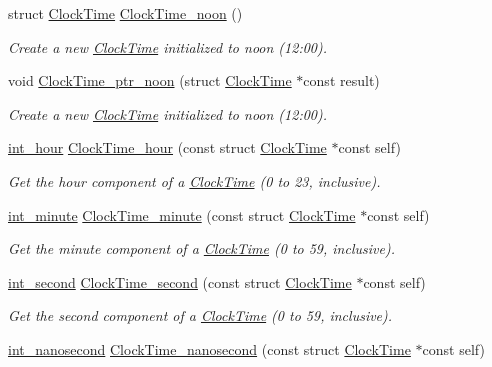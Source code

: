 \begin{DoxyCompactItemize}
struct \hyperlink{structClockTime}{Clock\-Time} \hyperlink{clock-time_8h_a183049a7386a7b7377ba3059d15485c4}{Clock\-Time\-\_\-noon} ()
\begin{DoxyCompactList}\small\item\em Create a new \hyperlink{structClockTime}{Clock\-Time} initialized to noon (12\-:00). \end{DoxyCompactList}\item 
void \hyperlink{clock-time_8h_a0d675e833b96d51d7ba743f09f6a0ee8}{Clock\-Time\-\_\-ptr\-\_\-noon} (struct \hyperlink{structClockTime}{Clock\-Time} $\ast$const result)
\begin{DoxyCompactList}\small\item\em Create a new \hyperlink{structClockTime}{Clock\-Time} initialized to noon (12\-:00). \end{DoxyCompactList}\item 
\hyperlink{types_8h_abc83767329d565949a30f9990b5b2323}{int\-\_\-hour} \hyperlink{clock-time_8h_a197ecd5df7f193d534e51794051ea68c}{Clock\-Time\-\_\-hour} (const struct \hyperlink{structClockTime}{Clock\-Time} $\ast$const self)
\begin{DoxyCompactList}\small\item\em Get the hour component of a \hyperlink{structClockTime}{Clock\-Time} (0 to 23, inclusive). \end{DoxyCompactList}\item 
\hyperlink{types_8h_ac1c9417e7360815b48bbc1efa2b8240c}{int\-\_\-minute} \hyperlink{clock-time_8h_a71ebda6c0d3f39c5ee3287170b081e62}{Clock\-Time\-\_\-minute} (const struct \hyperlink{structClockTime}{Clock\-Time} $\ast$const self)
\begin{DoxyCompactList}\small\item\em Get the minute component of a \hyperlink{structClockTime}{Clock\-Time} (0 to 59, inclusive). \end{DoxyCompactList}\item 
\hyperlink{types_8h_a48e89dcdfecb9766dce0baf6254d089e}{int\-\_\-second} \hyperlink{clock-time_8h_abd89cc75c460c6b9b906c2b433e0f29c}{Clock\-Time\-\_\-second} (const struct \hyperlink{structClockTime}{Clock\-Time} $\ast$const self)
\begin{DoxyCompactList}\small\item\em Get the second component of a \hyperlink{structClockTime}{Clock\-Time} (0 to 59, inclusive). \end{DoxyCompactList}\item 
\hyperlink{types_8h_a6bb2edd220168240795ae6d50d7bf140}{int\-\_\-nanosecond} \hyperlink{clock-time_8h_a68bdc6e05da575968f51c2fcff6bcb8e}{Clock\-Time\-\_\-nanosecond} (const struct \hyperlink{structClockTime}{Clock\-Time} $\ast$const self)

\end{DoxyCompactItemize}
